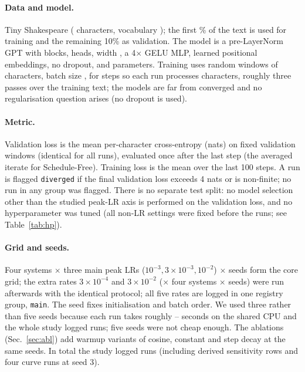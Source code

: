 \paragraph{Data and model.} Tiny Shakespeare ( characters, vocabulary ); the first \% of the text is used for training and the remaining 10\% as validation. The model is a pre-LayerNorm GPT with  blocks,  heads, width , a 4$\times$ GELU MLP, learned positional embeddings, no dropout, and  parameters. Training uses random windows of  characters, batch size , for  steps so each run processes  characters, roughly three passes over the training text; the models are far from converged and no regularisation question arises (no dropout is used).

\paragraph{Metric.} Validation loss is the mean per-character cross-entropy (nats) on  fixed validation windows (identical for all runs), evaluated once after the last step (the averaged iterate for Schedule-Free). Training loss is the mean over the last 100 steps. A run is flagged \texttt{diverged} if the final validation loss exceeds 4 nats or is non-finite; no run in any group was flagged. There is no separate test split: no model selection other than the studied peak-LR axis is performed on the validation loss, and no hyperparameter was tuned (all non-LR settings were fixed before the runs; see Table~\ref{tab:hp}).

\paragraph{Grid and seeds.} Four systems $\times$ three main peak LRs ($10^{-3},3\times10^{-3},10^{-2}$) $\times$  seeds form the core grid; the extra rates $3\times10^{-4}$ and $3\times10^{-2}$ ($\times$ four systems $\times$  seeds) were run afterwards with the identical protocol; all five rates are logged in one registry group, \texttt{main}. The seed fixes initialisation and batch order. We used three rather than five seeds because each run takes roughly -- seconds on the shared CPU and the whole study logged  runs; five seeds were not cheap enough. The ablations (Sec.~\ref{sec:abl}) add warmup variants of cosine, constant and step decay at the same seeds. In total the study logged  runs (including derived sensitivity rows and four curve runs at seed 3).

